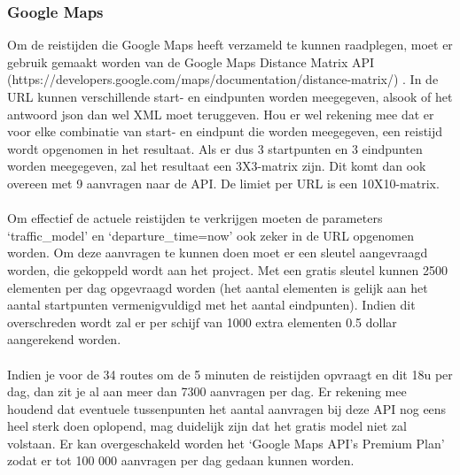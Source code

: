 \documentclass[ps,a4paper,oneside]{report}
\begin{document}
\subsubsection{Google Maps}
Om de reistijden die Google Maps heeft verzameld te kunnen raadplegen, moet er gebruik gemaakt worden van de Google Maps Distance Matrix API \\(https://developers.google.com/maps/documentation/distance-matrix/) . In de URL kunnen verschillende start- en eindpunten worden meegegeven, alsook of het antwoord json dan wel XML moet teruggeven. Hou er wel rekening mee dat er voor elke combinatie van start- en eindpunt die worden meegegeven, een reistijd wordt opgenomen in het resultaat. Als er dus 3 startpunten en 3 eindpunten worden meegegeven, zal het resultaat een 3X3-matrix zijn. Dit komt dan ook overeen met 9 aanvragen naar de API. De limiet per URL is een 10X10-matrix.\\\\
Om effectief de actuele reistijden te verkrijgen moeten de parameters \\‘traffic\_model’ en ‘departure\_time=now’ ook zeker in de URL opgenomen worden. Om deze aanvragen te kunnen doen moet er een sleutel aangevraagd worden, die gekoppeld wordt aan het project. Met een gratis sleutel kunnen 2500 elementen per dag opgevraagd worden (het aantal elementen is gelijk aan het aantal startpunten vermenigvuldigd met het aantal eindpunten). Indien dit overschreden wordt zal er per schijf van 1000 extra elementen 0.5 dollar aangerekend worden.\\\\
Indien je voor de 34 routes om de 5 minuten de reistijden opvraagt en dit 18u per dag, dan zit je al aan meer dan 7300 aanvragen per dag. Er rekening mee houdend dat eventuele tussenpunten het aantal aanvragen bij deze API nog eens heel sterk doen oplopend, mag duidelijk zijn dat het gratis model niet zal volstaan. Er kan overgeschakeld worden het ‘Google Maps API’s Premium Plan’ zodat er tot 100 000 aanvragen per dag gedaan kunnen worden.\\
\end{document}
